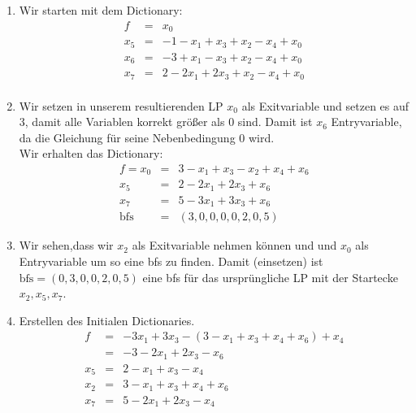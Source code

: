\documentclass[11pt,a4paper,ngerman]{article}
\begin{document}
\begin{enumerate}[1.]
    \item Wir starten mit dem Dictionary:
        \begin{equation*}\begin{array}{rcl}
            f & = & x_0\\
            x_5 & = & -1 - x_1 + x_3 + x_2 - x_4 + x_0\\
            x_6 & = & -3 + x_1 - x_3 + x_2 - x_4 + x_0\\
            x_7 & = & 2 - 2x_1 + 2x_3 + x_2 - x_4 + x_0\\
        \end{array}\end{equation*}
    \item Wir setzen in unserem resultierenden LP $x_0$ als Exitvariable und setzen es auf $3$, damit
        alle Variablen korrekt größer als $0$ sind. Damit ist $x_6$ Entryvariable, da die Gleichung
        für seine Nebenbedingung $0$ wird.\\
        Wir erhalten das Dictionary:
    \begin{equation*}\begin{array}{rcl}
        f = x_0 & = & 3 - x_1 + x_3 -x_2 + x_4 + x_6\\
        x_5 & = & 2 - 2x_1 + 2x_3 + x_6\\
        x_7 & = & 5 - 3x_1 + 3x_3 + x_6\\
        \text{bfs} & = & \left( 3 , 0, 0 ,0 ,0 , 2 , 0, 5 \right)  
    \end{array}\end{equation*}
    \item Wir sehen,dass wir $x_2$ als Exitvariable nehmen können und und $x_0$ als Entryvariable um so eine
        bfs zu finden. Damit (einsetzen) ist
        $\text{bfs} = (0, 3, 0, 0, 2, 0, 5)$ eine bfs für das ursprüngliche LP mit der Startecke
        $x_2, x_5, x_7$.
    \item Erstellen des Initialen Dictionaries.
        \begin{equation*}\begin{array}{rcl}
            f & = & -3x_1 + 3x_3 - (3 - x_1 + x_3 + x_4 + x_6) + x_4\\
                & = & -3 - 2x_1 + 2x_3 - x_6\\
            x_5 & = & 2 - x_1 + x_3 - x_4\\
            x_2 & = & 3 - x_1 + x_3 + x_4 + x_6\\
            x_7 & = & 5 - 2x_1 + 2x_3 - x_4\\

\end{array}
\end{equation*}
\end{enumerate}
\end{document}
